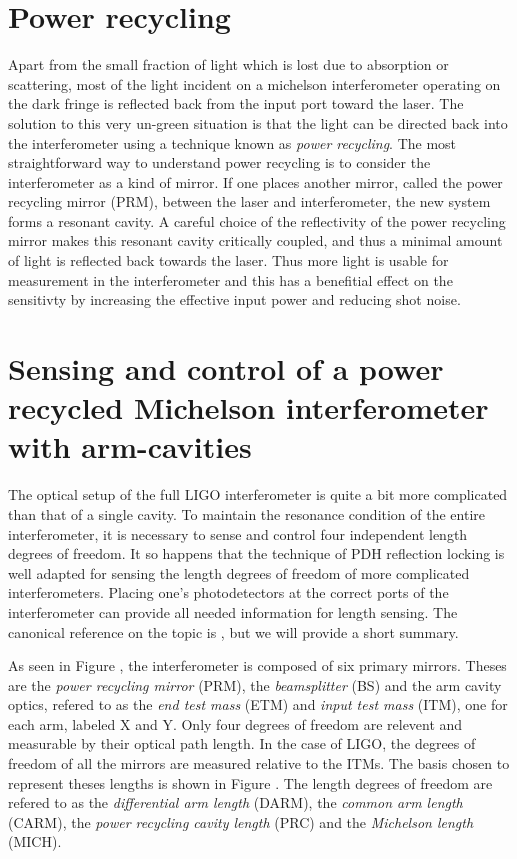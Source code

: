 \section{Power recycling}
Apart from the small fraction of light which is lost due to absorption or scattering, most of the light incident on a michelson interferometer operating on the dark fringe is reflected back from the input port toward the laser. %
The solution to this very un-green situation is that the light can be directed back into the interferometer using a technique known as \emph{power recycling}. %
The most straightforward way to understand power recycling is to consider the interferometer as a kind of mirror. %
If one places another mirror, called the power recycling mirror (PRM), between the laser and interferometer, the new system forms a resonant cavity. %
A careful choice of the reflectivity of the power recycling mirror makes this resonant cavity critically coupled, and thus a minimal amount of light is reflected back towards the laser. %
Thus more light is usable for measurement in the interferometer and this has a benefitial effect on the sensitivty by increasing the effective input power and reducing shot noise.

\section{Sensing and control of a power recycled Michelson interferometer with arm-cavities}
The optical setup of the full LIGO interferometer is quite a bit more complicated than that of a single cavity. %
To maintain the resonance condition of the entire interferometer, it is necessary to sense and control four independent length degrees of freedom. %
It so happens that the technique of PDH reflection locking is well adapted for sensing the length degrees of freedom of more complicated interferometers. %
Placing one's photodetectors at the correct ports of the interferometer can provide all needed information for length sensing. %
The canonical reference on the topic is \citet{Fritschel:01}, but we will provide a short summary.

As seen in Figure , the interferometer is composed of six primary mirrors. %
Theses are the \emph{power recycling mirror} (PRM), the \emph{beamsplitter} (BS) and the arm cavity optics, refered to as the \emph{end test mass} (ETM) and \emph{input test mass} (ITM), one for each arm, labeled X and Y. %
Only four degrees of freedom are relevent and measurable by their optical path length. %
In the case of LIGO, the degrees of freedom of all the mirrors are measured relative to the ITMs. %
The basis chosen to represent theses lengths is shown in Figure . %
The length degrees of freedom are refered to as the \emph{differential arm length} (DARM), the \emph{common arm length} (CARM), the \emph{power recycling cavity length} (PRC) and the \emph{Michelson length} (MICH).

